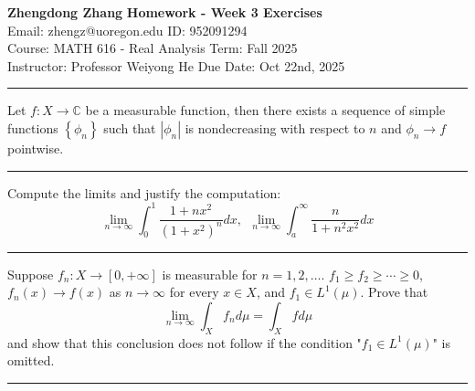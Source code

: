 \documentclass[letterpaper, 12pt]{article}
\begin{document}
\noindent
\large\textbf{Zhengdong Zhang} \hfill \textbf{Homework - Week 3 Exercises}   \\
Email: zhengz@uoregon.edu \hfill ID: 952091294 \\
\normalsize Course: MATH 616 - Real Analysis \hfill Term: Fall 2025 \\
Instructor: Professor Weiyong He \hfill Due Date: Oct 22nd, 2025 \\
\noindent\rule{7in}{2.8pt}
\begin{problem}{3.1}
Let \(f:X\rightarrow \mathbb{C}\) be a measurable function, then there exists a sequence of simple functions \(\left\{ \phi_n \right\}\) such that \(|\phi_n|\) is nondecreasing with respect to \(n\) and \(\phi_n\to f\) pointwise.
\end{problem}
\begin{solution}

\end{solution}

\noindent\rule{7in}{2.8pt}
\begin{problem}{3.2}
Compute the limits and justify the computation:
\[\lim_{n\to \infty}\int_{0}^{1}\frac{1+nx^2}{(1+x^2)^n}dx,\ \ \lim_{n\to \infty}\int_{a}^{\infty}\frac{n}{1+n^2x^2}dx\]
\end{problem}
\begin{solution}

\end{solution}

\noindent\rule{7in}{2.8pt}
\begin{problem}{1.7}
Suppose \(f_n:X\rightarrow [0,+\infty]\) is measurable for \(n=1,2,\ldots\). \(f_1\geq f_2\geq \cdots \geq 0\), \(f_n(x)\to f(x)\) as \(n\to \infty\) for every \(x\in X\), and \(f_1\in L^1(\mu)\). Prove that 
\[\lim_{n\to \infty}\int_X f_n d\mu=\int_X f d\mu\]
and show that this conclusion does not follow if the condition "\(f_1\in L^1(\mu)\)" is omitted.
\end{problem}
\begin{solution}

\end{solution}

\noindent\rule{7in}{2.8pt}
\end{document}
